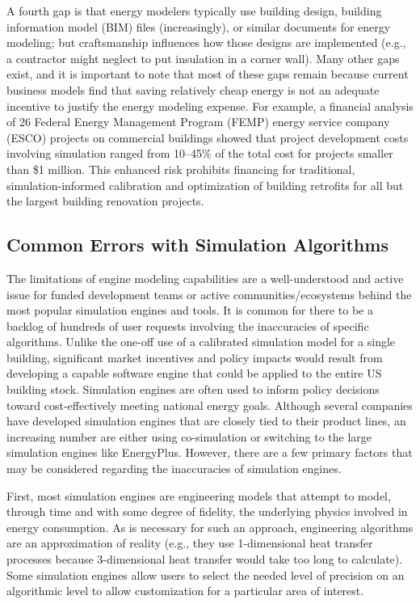 \documentclass[preprint, review, 12pt]{elsarticle}
\begin{document}
A fourth gap is that energy modelers typically use building design, building information model (BIM) files (increasingly), or similar documents for energy modeling; but craftsmanship influences how those designs are implemented (e.g., a contractor might neglect to put insulation in a corner wall). Many other gaps exist, and it is important to note that most of these gaps remain because current business models find that saving relatively cheap energy is not an adequate incentive to justify the energy modeling expense. For example, a financial analysis of 26 Federal Energy Management Program (FEMP) energy service company (ESCO) projects on commercial buildings showed that project development costs involving simulation ranged from 10--45\% of the total cost for projects smaller than \$1 million. This enhanced risk %
prohibits financing for traditional, simulation-informed calibration and optimization of building retrofits for all but the largest building renovation projects.

\subsection{Common Errors with Simulation Algorithms}
The limitations of engine modeling capabilities are a well-understood and active issue for funded development teams or active communities/ecosystems behind the most popular simulation engines and tools. It is common for there to be a backlog of hundreds of user requests involving the inaccuracies of specific algorithms. Unlike the one-off use of a calibrated simulation model for a single building, significant market incentives and policy impacts would result from developing a capable software engine that could be applied to the entire US building stock. Simulation engines are often used to inform policy decisions toward cost-effectively meeting national energy goals. Although several companies have developed simulation engines that are closely tied to their product lines, an increasing number are either using co-simulation or switching to the large simulation engines like EnergyPlus. However, there are a few primary factors that may be considered regarding the inaccuracies of simulation engines.

First, most simulation engines are engineering models that attempt to model, through time and with some degree of fidelity, the underlying physics involved in energy consumption. As is necessary for such an approach, engineering algorithms are an approximation of reality (e.g., they use 1-dimensional heat transfer processes because 3-dimensional heat transfer would take too long to calculate). Some simulation engines allow users to select the needed level of precision on an algorithmic level to allow customization for a particular area of interest. 
\end{document}
